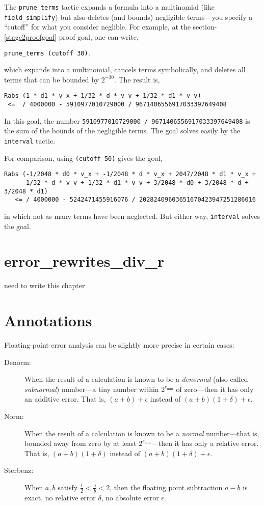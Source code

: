 \documentclass[article]{memoir}
\begin{document}
The \lstinline{prune_terms} tactic expands a formula into a
multinomial (like \lstinline{field_simplify}) but also
deletes (and bounds) negligible terms---you specify
a ``cutoff'' for what you consider neglible.  For example,
at the section-\ref{stage2proofgoal} proof goal,
one can write,

\begin{lstlisting}
prune_terms (cutoff 30).
\end{lstlisting}
which expands into a multinomial, cancels terms symbolically,
and deletes all terms that can be bounded by $2^{-30}$.
The result is,

\begin{lstlisting}
Rabs (1 * d1 * v_x + 1/32 * d * v_v + 1/32 * d1 * v_v)
 <=  / 4000000 - 5910977010729000 / 9671406556917033397649408
\end{lstlisting}
In this goal, the number \lstinline{5910977010729000 / 9671406556917033397649408} is the sum of the bounds of the negligible terms.
The goal solves easily by the \lstinline{interval} tactic.

For comparison, using \lstinline{(cutoff 50)} gives the goal,
\begin{lstlisting}
Rabs (-1/2048 * d0 * v_x + -1/2048 * d * v_x + 2047/2048 * d1 * v_x +
      1/32 * d * v_v + 1/32 * d1 * v_v + 3/2048 * d0 + 3/2048 * d + 3/2048 * d1)
   <= / 4000000 - 5242471455916076 / 20282409603651670423947251286016
\end{lstlisting}
in which not as many terms have been neglected.  But either way,
\lstinline{interval} solves the goal.

\chapter{error\_rewrites\_div\_r}

need to write this chapter

\chapter{Annotations}

Floating-point error analysis can be slightly more precise
in certain cases:

\begin{description}
\item[Denorm:]  When the result of a calculation is known to be a
  \emph{denormal} (also called \emph{subnormal}) number---a tiny
  number within $2^{e_\mathrm{min}}$ of zero---then it has only
  an additive error.  That is, $(a+b)+\epsilon$ instead of
  $(a+b)(1+\delta)+\epsilon$.
\item[Norm:]
   When the result of a calculation is known to be a
   \emph{normal} number---that is, bounded away from zero by
   at least $2^{e_\mathrm{min}}$---then it has only
  a relative error.  That is, $(a+b)(1+\delta)$ instead of
  $(a+b)(1+\delta)+\epsilon$.
\item[Sterbenz:]  When $a,b$ satisfy $\frac{1}{2} < \frac{a}{b} < 2$,
  then the floating point subtraction $a-b$ is exact, no relative
  error $\delta$, no absolute error $\epsilon$.
\end{description}
\end{document}
